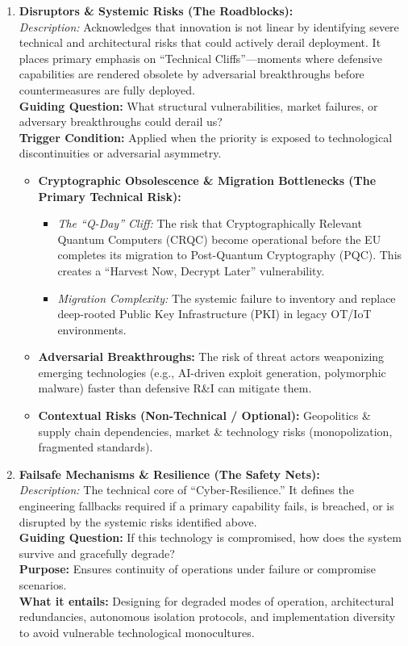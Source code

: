 \documentclass{ieeeaccess}
\begin{document}
\begin{enumerate}
    \item \textbf{Disruptors \& Systemic Risks (The Roadblocks):}\\
    \textit{Description:} Acknowledges that innovation is not linear by identifying severe technical and architectural risks that could actively derail deployment. It places primary emphasis on ``Technical Cliffs''---moments where defensive capabilities are rendered obsolete by adversarial breakthroughs before countermeasures are fully deployed.\\
    \textbf{Guiding Question:} What structural vulnerabilities, market failures, or adversary breakthroughs could derail us?\\
    \textbf{Trigger Condition:} Applied when the priority is exposed to technological discontinuities or adversarial asymmetry.
    \begin{itemize}
        \item \textbf{Cryptographic Obsolescence \& Migration Bottlenecks (The Primary Technical Risk):}
        \begin{itemize}
            \item \textit{The ``Q-Day'' Cliff:} The risk that Cryptographically Relevant Quantum Computers (CRQC) become operational before the EU completes its migration to Post-Quantum Cryptography (PQC). This creates a ``Harvest Now, Decrypt Later'' vulnerability.
            \item \textit{Migration Complexity:} The systemic failure to inventory and replace deep-rooted Public Key Infrastructure (PKI) in legacy OT/IoT environments.
        \end{itemize}
        \item \textbf{Adversarial Breakthroughs:} The risk of threat actors weaponizing emerging technologies (e.g., AI-driven exploit generation, polymorphic malware) faster than defensive R\&I can mitigate them.
        \item \textbf{Contextual Risks (Non-Technical / Optional):} Geopolitics \& supply chain dependencies, market \& technology risks (monopolization, fragmented standards).
    \end{itemize}

    \item \textbf{Failsafe Mechanisms \& Resilience (The Safety Nets):}\\
    \textit{Description:} The technical core of ``Cyber-Resilience.'' It defines the engineering fallbacks required if a primary capability fails, is breached, or is disrupted by the systemic risks identified above.\\
    \textbf{Guiding Question:} If this technology is compromised, how does the system survive and gracefully degrade?\\
    \textbf{Purpose:} Ensures continuity of operations under failure or compromise scenarios.\\
    \textbf{What it entails:} Designing for degraded modes of operation, architectural redundancies, autonomous isolation protocols, and implementation diversity to avoid vulnerable technological monocultures.


\end{enumerate}
\end{document}
